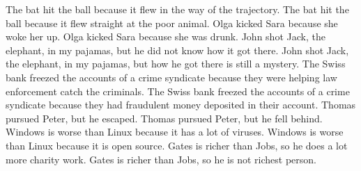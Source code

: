 \documentclass{article}
\begin{document}
\begin{enumerate}
	The bat hit the ball because it flew in the way of the trajectory.
	The bat hit the ball because it flew straight at the poor animal.
	Olga kicked Sara because she woke her up.
	Olga kicked Sara because she was drunk.
	John shot Jack, the elephant, in my pajamas, but he did not know how it got there.
	John shot Jack, the elephant, in my pajamas, but how he got there is still a mystery.
	The Swiss bank freezed the accounts of a crime syndicate because they were helping law enforcement catch the criminals.
	The Swiss bank freezed the accounts of a crime syndicate because they had fraudulent money deposited in their account.
	Thomas pursued Peter, but he escaped.
	Thomas pursued Peter, but he fell behind.
	Windows is worse than Linux because it has a lot of viruses.
	Windows is worse than Linux because it is open source.
	Gates is richer than Jobs, so he does a lot more charity work.
	Gates is richer than Jobs, so he is not richest person.
\end{enumerate}
\end{document}

